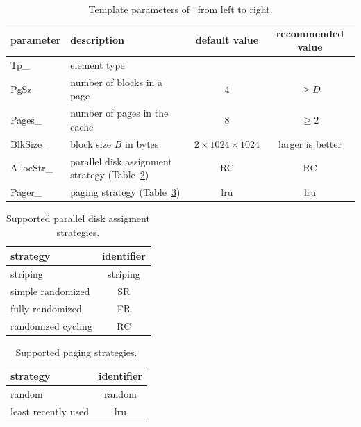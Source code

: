 \documentclass[twoside]{book}
\begin{document}
\begin{table}[h]
\begin{center}
\caption{Template parameters of \xvectorg\ from left to right.}
\label{vectorparam}
\begin{tabular}{|l|p{3.5cm}|c|c|}
\hline
parameter& description  & default value & recommended value \\
\hline\hline
Tp\_       & element type & & \\
\hline
PgSz\_     & number of blocks in a 
page
& 4 & $\geq D$\\
\hline
Pages\_    & number of pages in the cache & 8 & $\geq 2$ \\
\hline
BlkSize\_  & block size $B$ in bytes & $2\times 1024\times 1024$ & larger
is better\\
\hline
AllocStr\_ & parallel disk assignment strategy 
(Table~\ref{allocstr})
& RC & RC \\
\hline
Pager\_ & paging strategy 
(Table~\ref{pagingstr})
& lru & lru \\
\hline
\end{tabular}
\end{center}
\end{table}



\begin{table}[h]
\begin{center}
\caption{Supported parallel disk assigment strategies.}
\label{allocstr}
\begin{tabular}{|l|c|}
\hline
strategy & identifier  \\
\hline\hline
striping & striping \\
\hline
simple randomized & SR\\
\hline
fully randomized & FR\\
\hline
randomized cycling & RC \\
\hline
\end{tabular}
\end{center}
\end{table}

\begin{table}[h]
\begin{center}
\caption{Supported paging strategies.}
\label{pagingstr}
\begin{tabular}{|l|c|}
\hline
strategy & identifier  \\
\hline\hline
random & random \\
\hline
least recently used & lru\\
\hline
\end{tabular}
\end{center}
\end{table}
\end{document}
